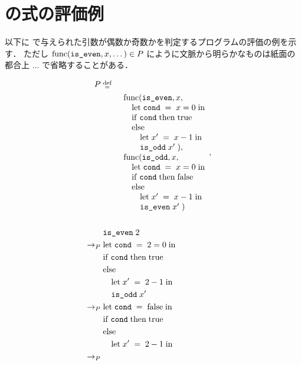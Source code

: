 
\section{\Yil の式の評価例}
\label{sec:lang:semantics:example}

\par 以下に \Yil で与えられた引数が偶数か奇数かを判定するプログラムの評価の例を示す．
ただし $\Func{\code{is\_even}}{x}{\dots} \in P$ にように文脈から明らかなものは紙面の都合上 $\dots$ で省略することがある．

\begin{align*}
  P \; &\defeq& \; \\
  &\quad\quad \begin{array}{l}
    \Func
      {\code{is\_even}}{x}
      {\\ \quad \Let
        {\; \code{cond} \;}{\; x=0 \;}
        {\\ \quad \If{\; \code{cond} \;}{\; \true \\ \quad}
        {\\ \quad\quad \Let{\; x' \;}{\; x-1 \;}
        {\\ \quad\quad \App{\code{is\_odd}}{x'}}} \; }
      }, \\
    \Func
      {\code{is\_odd}}{x}
      {\\ \quad \Let
        {\; \code{cond} \;}{\; x = 0 \;}
        {\\ \quad \If{\; \code{cond} \;}{\; \false \\ \quad}
        {\\ \quad\quad \Let{\; x' \;}{\; x-1 \;}
        {\\ \quad\quad \App{\code{is\_even}}{x'}}} \;}
      }
  \end{array}, \\\\ &
    \Reduce{P}{\App{\code{is\_even}}{2} \\}{
    \Reduce{P}{
      & \Let{\; \code{cond} \;}{\; 2 = 0 \;}{ \\
      & \If{\; \code{cond} \;}{\; \true \\ &}{\\
      & \quad \Let{\; x' \;}{\; 2 - 1 \;}{\\
      & \quad \App{\code{is\_odd}}{x'}}}} \\ }{
    \Reduce{P}{
      & \Let{\; \code{cond} \;}{\; \false \;}{ \\
      & \If{\; \code{cond} \;}{\; \true \\ &}{\\
      & \quad \Let{\; x' \;}{\; 2 - 1 \;}{\\
}}}}}}
\end{align*}
